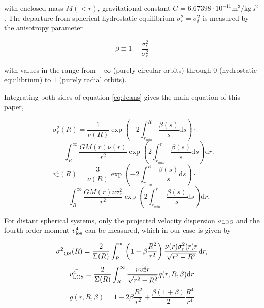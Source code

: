 with enclosed mass $M(<r)$, gravitational constant $G =
6.67398\cdot10^{-11} \text{m}^3/\text{kg}\,\text{s}^2$. The departure
from spherical hydrostatic equilibrium $\sigma_r^2=\sigma_t^2$ is
measured by the anisotropy parameter

\begin{equation}
\beta \equiv 1-\frac{\sigma_t^2}{\sigma_r^2}
\end{equation}

with values in the range from $-\infty$ (purely circular orbits)
through $0$ (hydrostatic equilibrium) to $1$ (purely radial orbits).

Integrating both sides of equation \ref{eq:Jeans} gives the main
equation of this paper,

\begin{equation}\label{eq:main}
\sigma_r^2(R) = \frac{1}{\nu(R)}\exp\left(-2\int_{r_{min}}^{R}\frac{\beta(s)}{s}\text{d}s\right)\cdot\qquad
\end{equation}
\begin{equation*}
\qquad\int_R^\infty \frac{GM(r)\nu(r)}{r^2} \exp\left(2\int_{r_{min}}^r\frac{\beta(s)}{s}\text{d}s\right)\text{d}r.
\end{equation*}
\begin{equation*}
\bar{v_r^4}(R) = \frac{3}{\nu(R)}\exp\left(-2\int_{r_{min}}^{R}\frac{\beta(s)}{s}\text{d}s\right)\cdot\qquad
\end{equation*}
\begin{equation*}
\qquad\int_R^\infty \frac{GM(r)\nu\sigma_r^2}{r^2} \exp\left(2\int_{r_{min}}^r\frac{\beta(s)}{s}\text{d}s\right)\text{d}r.
\end{equation*}

For distant spherical systems, only the projected velocity dispersion
$\sigma_{\text{LOS}}$ and the fourth order moment $\bar{v_{\rm los}^4}$ can be
measured, which in our case is given by

\begin{equation}\label{eq:LOS}
\sigma_{\text{LOS}}^2(R) = \frac{2}{\Sigma(R)}\int_R^\infty \left(1-\beta\frac{R^2}{r^2}\right) \frac{\nu(r)\sigma_r^2(r) r}{\sqrt{r^2-R^2}}\text{d}r,
\end{equation}
\begin{equation}\label{eq:kappa}
\bar{v_{\rm LOS}^4} = \frac{2}{\Sigma(R)}\int_R^\infty\frac{\nu \bar{v_r^4}r}{\sqrt{r^2-R^2}}g(r,R,\beta)\text{d}r
\end{equation}
\begin{equation*}
g(r,R,\beta) = 1-2\beta\frac{R^2}{r^2}+\frac{\beta(1+\beta)}{2}\frac{R^4}{r^4}
\end{equation*}


